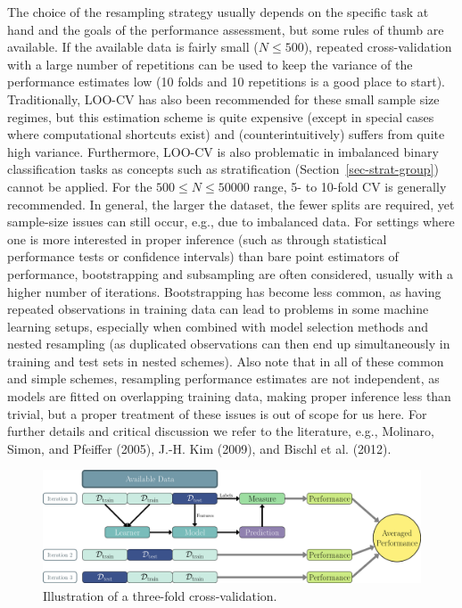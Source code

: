 The choice of the resampling strategy usually depends on the specific
task at hand and the goals of the performance assessment, but some rules
of thumb are available. If the available data is fairly small
(\(N \leq 500\)), repeated cross-validation with a large number of
repetitions can be used to keep the variance of the performance
estimates low (10 folds and 10 repetitions is a good place to start).
Traditionally, LOO-CV has also been recommended for these small sample
size regimes, but this estimation scheme is quite expensive (except in
special cases where computational shortcuts exist) and
(counterintuitively) suffers from quite high variance. Furthermore,
LOO-CV is also problematic in imbalanced binary classification tasks as
concepts such as stratification (Section~\ref{sec-strat-group}) cannot
be applied. For the \(500 \leq N \leq 50000\) range, 5- to 10-fold CV is
generally recommended. In general, the larger the dataset, the fewer
splits are required, yet sample-size issues can still occur, e.g., due
to imbalanced data. For settings where one is more interested in proper
inference (such as through statistical performance tests or confidence
intervals) than bare point estimators of performance, bootstrapping and
subsampling are often considered, usually with a higher number of
iterations. Bootstrapping has become less common, as having repeated
observations in training data can lead to problems in some machine
learning setups, especially when combined with model selection methods
and nested resampling (as duplicated observations can then end up
simultaneously in training and test sets in nested schemes). Also note
that in all of these common and simple schemes, resampling performance
estimates are not independent, as models are fitted on overlapping
training data, making proper inference less than trivial, but a proper
treatment of these issues is out of scope for us here. For further
details and critical discussion we refer to the literature, e.g.,
Molinaro, Simon, and Pfeiffer (2005), J.-H. Kim (2009), and Bischl et
al. (2012).

\begin{figure}

{\centering \includegraphics[width=1\textwidth,height=\textheight]{chapters/chapter3/Figures/mlr3book_figures-6.png}

}

\caption{\label{fig-cv-illustration}Illustration of a three-fold
cross-validation.}

\end{figure}

